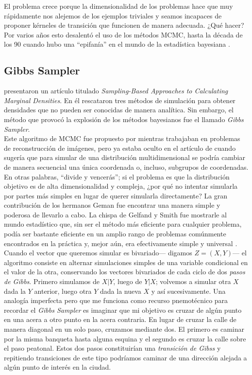  El problema crece porque la dimensionalidad de los problemas hace que muy rápidamente nos alejemos de los ejemplos triviales y seamos incapaces de proponer kérneles de transición que funcionen de manera adecuada. ¿Qué hacer? Por varios años esto desalentó el uso de los métodos MCMC, hasta la década de los 90 cuando hubo una ``epifanía'' en el mundo de la estadística bayesiana \parencite{RobertCasella11}. 

\subsection{Gibbs Sampler}

\textcite{GelfandSmith90} presentaron un artículo titulado \textit{Sampling-Based Approaches to Calculating Marginal Densities}. En él rescataron tres métodos de simulación para obtener densidades que no pueden ser conocidas de manera analítica. Sin embargo, el método que provocó la explosión de los métodos bayesianos fue el llamado \textit{Gibbs Sampler}.\\ 

Este algoritmo de MCMC fue propuesto por \textcite{GemanGeman84} mientras trabajaban en problemas de reconstrucción de imágenes, pero ya estaba oculto en el artículo de \textcite{Hastings70} cuando sugería que para simular de una distribución multidimensional se podría cambiar de manera secuencial una única coordenada o, incluso, subgrupos de coordenadas. En otras palabras, ``divide y vencerás''; si el problema es que la distribución objetivo es de alta dimensionalidad y compleja, ¿por qué no intentar simularla por partes más simples en lugar de querer simularla directamente? La gran contribución de los hermanos Geman fue encontrar una manera simple y poderosa de llevarlo a cabo. La chispa de Gelfand y Smith fue mostrarle al mundo estadístico que, sin ser el método más eficiente para cualquier problema, podía ser bastante eficiente en un amplio rango de problemas comúnmente encontrados en la práctica y, mejor aún, era efectivamente simple y universal \parencite{GelfandEtAl90}.\\

Cuando el vector que queremos simular es bivariado--- digamos $Z = (X,Y)$--- el algoritmo consiste en alternar simulaciones simples de una variable condicional en el valor de la otra, conservando los vectores bivariados de cada ciclo de dos \textit{pasos de Gibbs}. Primero simulamos de $X|Y$, luego de $Y|X$; volvemos a simular otra $X$ dada la $Y$ anterior, luego otra $Y$ dada la nueva $X$ y así sucesivamente. Una analogía imperfecta pero que me funciona como recurso pnemotécnico para recordar el \textit{Gibbs Sampler} es imaginar que mi objetivo es cruzar de algún punto en una acera a otro punto en la acera contraria. En lugar de cruzar la calle de manera diagonal en un solo paso, cruzamos mediante dos. El primero es caminar por la misma banqueta hasta alguna esquina y el segundo es cruzar la calle sobre el paso peatonal. Estos dos pasos constituirían una \textit{transición de Gibss} y repitiendo transiciones de este tipo podríamos caminar de una dirección alejada a algún punto de interés en la ciudad.\\ 

